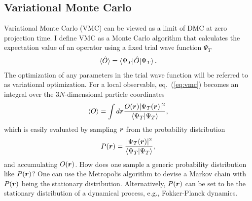 \subsection{Variational Monte Carlo}
Variational Monte Carlo (VMC) can be viewed as a limit of DMC at zero projection time. I define VMC as a Monte Carlo algorithm that calculates the expectation value of an operator using a fixed trial wave function $\Psi_T$
\begin{align} \label{eq:vmc}
\braket{\hat{O}} = \braket{\Psi_T|\hat{O}|\Psi_T}.
\end{align}
The optimization of any parameters in the trial wave function will be referred to as variational optimization.
For a local observable, eq.~(\ref{eq:vmc}) becomes an integral over the $3N$-dimensional particle coordinates
\begin{align}
\braket{O} = \int d\boldsymbol{r} \dfrac{O(\boldsymbol{r})\vert\Psi_T(\boldsymbol{r})\vert^2}{\braket{\Psi_T|\Psi_T}},
\end{align}
which is easily evaluated by sampling $\boldsymbol{r}$ from the probability distribution
\begin{align}
P(\boldsymbol{r}) = \dfrac{\vert\Psi_T(\boldsymbol{r})\vert^2}{\braket{\Psi_T|\Psi_T}},
\end{align}
and accumulating $O(\boldsymbol{r})$. How does one sample a generic probability distribution like $P(\boldsymbol{r})$? One can use the Metropolis algorithm to devise a Markov chain with $P(\boldsymbol{r})$ being the stationary distribution. Alternatively, $P(\boldsymbol{r})$ can be set to be the stationary distribution of a dynamical process, e.g., Fokker-Planck dynamics.

